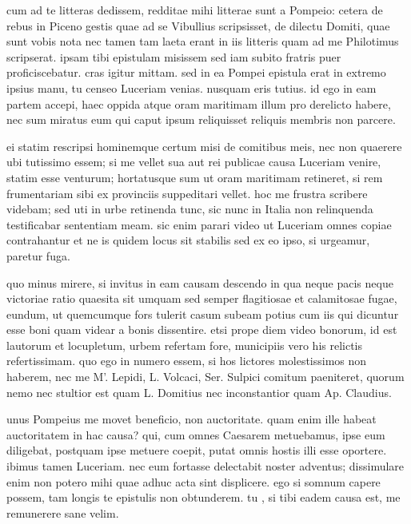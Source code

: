 


 cum ad te litteras dedissem, redditae mihi litterae sunt a Pompeio: cetera de rebus in Piceno gestis quae ad se Vibullius scripsisset, de dilectu Domiti, quae sunt vobis nota nec tamen tam laeta erant in iis litteris quam ad me Philotimus scripserat. ipsam tibi epistulam misissem sed iam subito fratris puer proficiscebatur. cras igitur mittam. sed in ea Pompei epistula erat in extremo ipsius manu, tu censeo Luceriam venias. nusquam eris tutius. id ego in eam partem accepi, haec oppida atque oram maritimam illum pro derelicto habere, nec sum miratus eum qui caput ipsum reliquisset reliquis membris non parcere.

 ei statim rescripsi hominemque certum misi de comitibus meis, nec non quaerere ubi tutissimo essem; si me vellet sua aut rei publicae causa Luceriam venire, statim esse venturum; hortatusque sum ut oram maritimam retineret, si rem frumentariam sibi ex provinciis suppeditari vellet. hoc me frustra scribere videbam; sed uti in urbe retinenda tunc, sic nunc in Italia non relinquenda testificabar sententiam meam. sic enim parari video ut Luceriam omnes copiae contrahantur et ne is quidem locus sit stabilis sed ex eo ipso, si urgeamur, paretur fuga.

 quo minus mirere, si invitus in eam causam descendo in qua neque pacis neque victoriae ratio quaesita sit umquam sed semper flagitiosae et calamitosae fugae, eundum, ut quemcumque fors tulerit casum subeam potius cum iis qui dicuntur esse boni quam videar a bonis dissentire. etsi prope diem video bonorum, id est lautorum et locupletum, urbem refertam fore, municipiis vero his relictis refertissimam. quo ego in numero essem, si hos lictores molestissimos non haberem, nec me M'. Lepidi, L. Volcaci, Ser. Sulpici comitum paeniteret, quorum nemo nec stultior est quam L. Domitius nec inconstantior quam Ap. Claudius.

 unus Pompeius me movet beneficio, non auctoritate. quam enim ille habeat auctoritatem in hac causa? qui, cum omnes Caesarem metuebamus, ipse eum diligebat, postquam ipse metuere coepit, putat omnis hostis illi esse oportere. ibimus tamen Luceriam. nec eum fortasse delectabit noster adventus; dissimulare enim non potero mihi quae adhuc acta sint displicere. ego si somnum capere possem, tam longis te epistulis non obtunderem. tu , si tibi eadem causa est, me remunerere sane velim.
